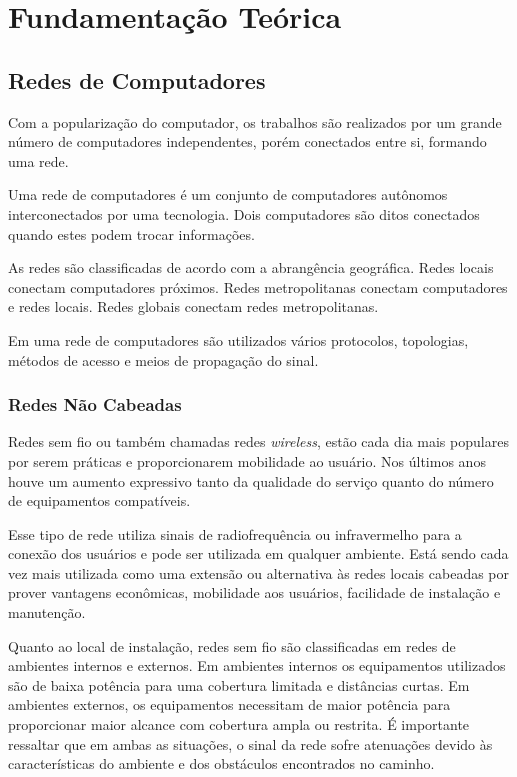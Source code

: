 \documentclass[tc,twoside]{iiufrgs}
\begin{document}
 

\chapter{Fundamentação Teórica} 

\section{Redes de Computadores}

Com a popularização do computador, os trabalhos são realizados por um grande número de computadores independentes, porém conectados entre si, formando uma rede. \cite{tanenbaum2003redes} %

Uma rede de computadores é um conjunto de computadores autônomos interconectados por uma tecnologia. Dois computadores são ditos conectados quando estes podem trocar informações. \cite{tanenbaum2003redes} %

As redes são classificadas de acordo com a abrangência geográfica. Redes locais conectam computadores próximos. Redes metropolitanas conectam computadores e redes locais. Redes globais conectam redes metropolitanas. \cite{tanenbaum2003redes} %

Em uma rede de computadores são utilizados vários protocolos, topologias, métodos de acesso e meios de propagação do sinal. \cite{brisa1997redes} %

\subsection{Redes Não Cabeadas}

Redes sem fio ou também chamadas redes \textit{wireless}, estão cada dia mais populares por serem práticas e proporcionarem mobilidade ao usuário. Nos últimos anos houve um aumento expressivo tanto da qualidade do serviço quanto do número de equipamentos compatíveis. \cite{rappaport2009comunicacoes} %

Esse tipo de rede utiliza sinais de radiofrequência ou infravermelho para a conexão dos usuários e pode ser utilizada em qualquer ambiente. Está sendo cada vez mais utilizada como uma extensão ou alternativa às redes locais cabeadas por prover vantagens econômicas, mobilidade aos usuários, facilidade de instalação e manutenção. \cite{sanches2005projetando} \cite{torres2015redes} %

Quanto ao local de instalação, redes sem fio são classificadas em redes de ambientes internos e externos. Em ambientes internos os equipamentos utilizados são de baixa potência para uma cobertura limitada e distâncias curtas. Em ambientes externos, os equipamentos necessitam de maior potência para proporcionar maior alcance com cobertura ampla ou restrita. É importante ressaltar que em ambas as situações, o sinal da rede sofre atenuações devido às características do ambiente e dos obstáculos encontrados no caminho. \cite{rappaport2009comunicacoes} %
\end{document}
